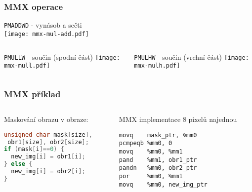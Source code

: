 \documentclass{beamer}
\begin{document}
\begin{frame}
\frametitle{MMX operace}
\small
    \begin{center}
    \texttt{PMADDWD} - vynásob a sečti\\
    \texttt{[image: mmx-mul-add.pdf]}
    \end{center}
\vspace{-1cm}
\begin{columns}[t,onlytextwidth]
  \begin{column}{0.5\textwidth}
    \begin{center}
    \texttt{PMULLW} - součin (spodní část)
    \texttt{[image: mmx-mull.pdf]}
    \end{center}
  \end{column}
  \begin{column}{0.5\textwidth}
    \begin{center}
    \texttt{PMULHW} - součin (vrchní část)
    \texttt{[image: mmx-mulh.pdf]}
    \end{center}
  \end{column}
\end{columns}


\end{frame}


\begin{frame}[fragile]
\frametitle{MMX příklad}

\begin{columns}[t,onlytextwidth]
  \begin{column}{0.5\textwidth}
Maskování obrazu v obraze:
\begin{lstlisting}[language={C},columns=flexible]
unsigned char mask[size],
 obr1[size], obr2[size];
if (mask[i]==0) {
  new_img[i] = obr1[i];
} else {
  new_img[i] = obr2[i];
}
\end{lstlisting}

  \end{column}
  \begin{column}{0.5\textwidth}
MMX implementace 8 pixelů najednou
\begin{lstlisting}[language={[x86masm]Assembler},columns=flexible]
movq    mask_ptr, %mm0
pcmpeqb %mm0, 0
movq    %mm0, %mm1
pand    %mm1, obr1_ptr
pandn   %mm0, obr2_ptr
por     %mm0, %mm1
movq    %mm0, new_img_ptr
\end{lstlisting}
  \end{column}
\end{columns}
\end{frame}
\end{document}
